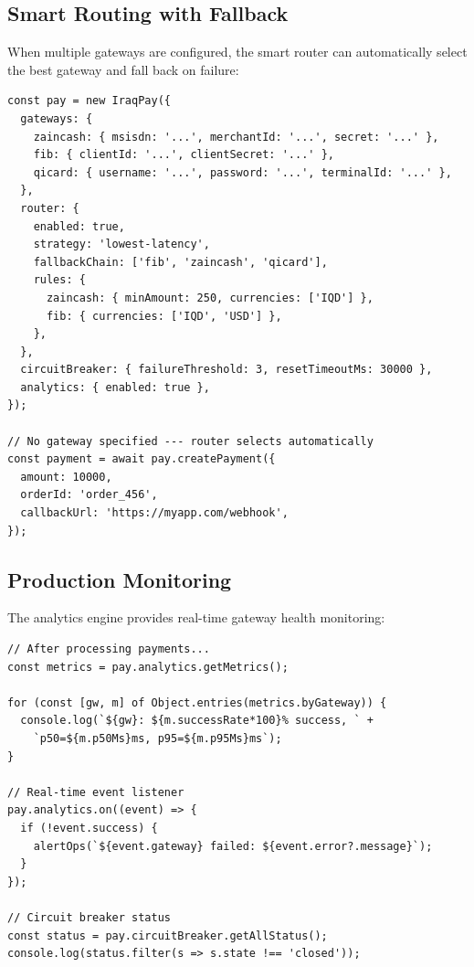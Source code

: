 \documentclass[preprint,12pt]{elsarticle}
\begin{document}
\subsection{Smart Routing with Fallback}

When multiple gateways are configured, the smart router can automatically select the best gateway and fall back on failure:

\begin{lstlisting}[style=typescript,caption={Smart routing with circuit breaker and analytics},label={lst:routing}]
const pay = new IraqPay({
  gateways: {
    zaincash: { msisdn: '...', merchantId: '...', secret: '...' },
    fib: { clientId: '...', clientSecret: '...' },
    qicard: { username: '...', password: '...', terminalId: '...' },
  },
  router: {
    enabled: true,
    strategy: 'lowest-latency',
    fallbackChain: ['fib', 'zaincash', 'qicard'],
    rules: {
      zaincash: { minAmount: 250, currencies: ['IQD'] },
      fib: { currencies: ['IQD', 'USD'] },
    },
  },
  circuitBreaker: { failureThreshold: 3, resetTimeoutMs: 30000 },
  analytics: { enabled: true },
});

// No gateway specified --- router selects automatically
const payment = await pay.createPayment({
  amount: 10000,
  orderId: 'order_456',
  callbackUrl: 'https://myapp.com/webhook',
});
\end{lstlisting}

\subsection{Production Monitoring}

The analytics engine provides real-time gateway health monitoring:

\begin{lstlisting}[style=typescript,caption={Accessing per-gateway metrics},label={lst:metrics}]
// After processing payments...
const metrics = pay.analytics.getMetrics();

for (const [gw, m] of Object.entries(metrics.byGateway)) {
  console.log(`${gw}: ${m.successRate*100}% success, ` +
    `p50=${m.p50Ms}ms, p95=${m.p95Ms}ms`);
}

// Real-time event listener
pay.analytics.on((event) => {
  if (!event.success) {
    alertOps(`${event.gateway} failed: ${event.error?.message}`);
  }
});

// Circuit breaker status
const status = pay.circuitBreaker.getAllStatus();
console.log(status.filter(s => s.state !== 'closed'));
\end{lstlisting}
\end{document}
